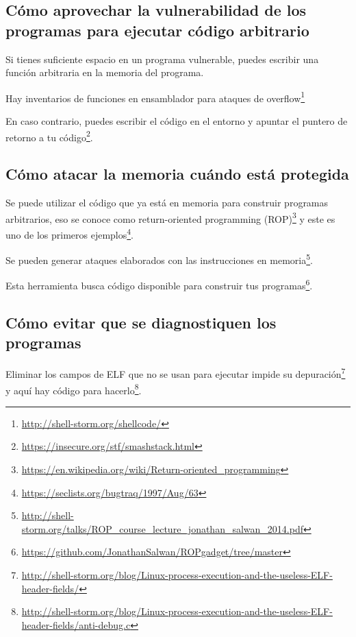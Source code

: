 \documentclass[
  12,
]{scrartcl}
\DeclareRobustCommand{\href}[2]{#2\footnote{\url{#1}}}
\begin{document}
\hypertarget{cuxf3mo-aprovechar-la-vulnerabilidad-de-los-programas-para-ejecutar-cuxf3digo-arbitrario}{%
\subsection{Cómo aprovechar la vulnerabilidad de los programas para
ejecutar código
arbitrario}\label{cuxf3mo-aprovechar-la-vulnerabilidad-de-los-programas-para-ejecutar-cuxf3digo-arbitrario}}

Si tienes suficiente espacio en un programa vulnerable, puedes escribir
una función arbitraria en la memoria del programa.

Hay \href{http://shell-storm.org/shellcode/}{inventarios de funciones en
ensamblador para ataques de overflow}

En caso contrario,
\href{https://insecure.org/stf/smashstack.html}{puedes escribir el
código en el entorno y apuntar el puntero de retorno a tu código}.

\hypertarget{cuxf3mo-atacar-la-memoria-cuuxe1ndo-estuxe1-protegida}{%
\subsection{Cómo atacar la memoria cuándo está
protegida}\label{cuxf3mo-atacar-la-memoria-cuuxe1ndo-estuxe1-protegida}}

Se puede utilizar el código que ya está en memoria para construir
programas arbitrarios, eso se conoce como
\href{https://en.wikipedia.org/wiki/Return-oriented_programming}{return-oriented
programming (ROP)} y
\href{https://seclists.org/bugtraq/1997/Aug/63}{este es uno de los
primeros ejemplos}.

\href{http://shell-storm.org/talks/ROP_course_lecture_jonathan_salwan_2014.pdf}{Se
pueden generar ataques elaborados con las instrucciones en memoria}.

\href{https://github.com/JonathanSalwan/ROPgadget/tree/master}{Esta
herramienta busca código disponible para construir tus programas}.

\hypertarget{cuxf3mo-evitar-que-se-diagnostiquen-los-programas}{%
\subsection{Cómo evitar que se diagnostiquen los
programas}\label{cuxf3mo-evitar-que-se-diagnostiquen-los-programas}}

\href{http://shell-storm.org/blog/Linux-process-execution-and-the-useless-ELF-header-fields/}{Eliminar
los campos de ELF que no se usan para ejecutar impide su depuración} y
\href{http://shell-storm.org/blog/Linux-process-execution-and-the-useless-ELF-header-fields/anti-debug.c}{aquí
hay código para hacerlo}.
\end{document}
